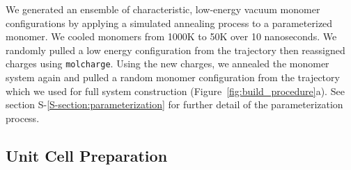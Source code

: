\documentclass[journal=jpcbfk,manuscript=article]{achemso}
\begin{document}
  We generated an ensemble of characteristic, low-energy vacuum monomer
  configurations by applying a simulated annealing process to a
  parameterized monomer. We cooled monomers from 1000K to 50K over 10
  nanoseconds. We randomly pulled a low energy configuration from the
  trajectory then reassigned charges using \texttt{molcharge}. Using the new
  charges, we annealed the monomer system again and pulled a random monomer
  configuration from the trajectory which we used for full system
  construction (Figure~\ref{fig:build_procedure}a). See section S-\ref{S-section:parameterization} 
  for further detail of the parameterization process.

  \subsection{Unit Cell Preparation}
\end{document}
